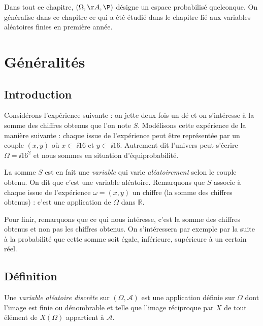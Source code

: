 \documentclass[french,11pt,twoside]{VcCours}
\begin{document}

\tableofcontents
\separationTitre


Dans tout ce chapitre, $(\Omega, \AA, \P)$ désigne un espace probabilisé quelconque. On généralise dans ce chapitre ce qui a été étudié dans le chapitre lié aux variables aléatoires finies en première année.


\section{Généralités}
\subsection{Introduction}

Considérons l'expérience suivante : on jette deux fois un dé et on s'intéresse à la somme des chiffres obtenus que l'on note $S$. Modélisons cette expérience de la manière suivante : chaque issue de l'expérience peut être représentée par un couple $(x,y)$ où $x \in$ $\ii16$ et $y  \in$ $\ii16$. Autrement dit l'univers peut s'écrire $\Omega = \ii16^2$ et nous sommes en situation d'équiprobabilité.
%
%

\vspace*{0.2cm}

La somme $S$ est en fait une \og \emph{variable} \fg  qui varie \emph{aléatoirement} selon le couple obtenu. On dit que c'est une variable aléatoire. Remarquons que $S$ associe à chaque issue de l'expérience $\omega=(x,y)$ un chiffre (la somme des chiffres obtenus) : c'est une application de $\Omega$ dans $\mathbb{R}$.

\vspace*{0.2cm}

Pour finir, remarquons que ce qui nous intéresse, c'est la somme des chiffres obtenus et non pas les chiffres obtenus. On s'intéressera par exemple par la suite à la probabilité que cette somme soit égale, inférieure, supérieure à un certain réel.

\subsection{Définition}
\begin{Definition}{}
Une \emph{variable aléatoire discrète} sur $(\Omega, \mathcal{A})$ est une application définie sur $\Omega$ dont l'image est finie ou dénombrable et telle que l'image réciproque par $X$ de tout élément de $X(\Omega)$ appartient à $\mathcal{A}$.
\end{Definition}
\end{document}
